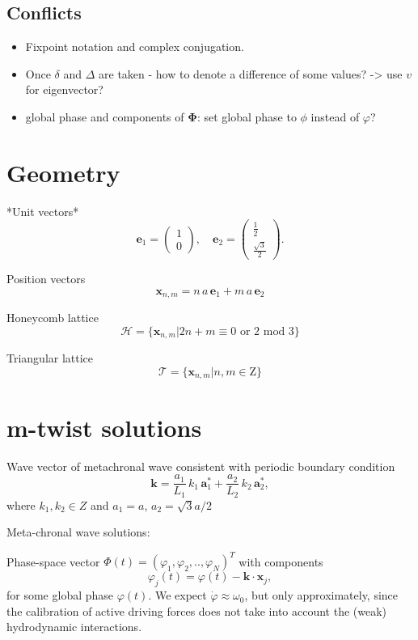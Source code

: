 \documentclass[a4paper,12pt]{article}
\newcommand*{\D}{\Delta}%
\begin{document}
\subsection{Conflicts}

\begin{itemize}

\item Fixpoint notation and complex conjugation.
\item Once $\delta$ and $\D$ are taken - how to denote a difference of some values? -> use $v$ for eigenvector?
\item global phase and components of $\mathbf{\Phi}$: set global phase to $\phi$ instead of $\varphi$?
\end{itemize}


\section{Geometry}

*Unit vectors*
$$
\mathbf{e}_1 =\left( \begin{array}{c} 1 \\ 0 \end{array} \right), \quad
\mathbf{e}_2 =\left( \begin{array}{c} \frac{1}{2} \\  \frac{\sqrt{3}}{2} \end{array} \right).
$$

Position vectors
$$
\mathbf{x}_{n,m} = n\,a\,\mathbf{e}_1 +  m\,a\,\mathbf{e}_2
$$

Honeycomb lattice
$$
\mathcal{H} = \{ \mathbf{x}_{n,m} | 2n+m \equiv 0 \text{ or } 2 \text{ mod } 3\}
$$

Triangular lattice
$$
\mathcal{T} = \{ \mathbf{x}_{n,m} | n,m \in \mathrm{Z} \}
$$

\section{m-twist solutions}

Wave vector of metachronal wave consistent with periodic boundary condition
$$ \mathbf{k} = \frac{a_1}{L_1}\,k_1\,\mathbf{a}_1^* + \frac{a_2}{L_2}\,k_2\,\mathbf{a}_2^*, $$
where $k_1,k_2\in{Z}$ and $a_1=a$, $a_2 = \sqrt{3} a/2$

Meta-chronal wave solutions:

Phase-space vector
$ \Phi (t) = (\varphi_1, \varphi_2, .., \varphi_{N})^T $
with components
$$
\varphi_j(t) = \varphi(t) - \mathbf{k} \cdot \mathbf{x}_j,
$$
for some global phase $\varphi(t)$.
We expect $\dot{\varphi}\approx\omega_0$, but only approximately, since the calibration of active driving forces does not take into account the (weak) hydrodynamic interactions.
\end{document}
